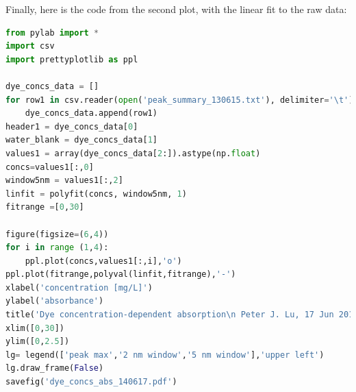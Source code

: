 Finally, here is the code from the second plot, with the linear fit to the
{raw data}:
\begin{lstlisting}[showspaces=false,showtabs=false,language=python,basicstyle=\ttfamily\footnotesize,columns=fixed,frame=tlbr,float]
from pylab import *
import csv
import prettyplotlib as ppl

dye_concs_data = []
for row1 in csv.reader(open('peak_summary_130615.txt'), delimiter='\t'): 
    dye_concs_data.append(row1)
header1 = dye_concs_data[0]
water_blank = dye_concs_data[1]
values1 = array(dye_concs_data[2:]).astype(np.float)
concs=values1[:,0]
window5nm = values1[:,2]
linfit = polyfit(concs, window5nm, 1)
fitrange =[0,30]

figure(figsize=(6,4))
for i in range (1,4):
    ppl.plot(concs,values1[:,i],'o')
ppl.plot(fitrange,polyval(linfit,fitrange),'-')
xlabel('concentration [mg/L]')
ylabel('absorbance')
title('Dye concentration-dependent absorption\n Peter J. Lu, 17 Jun 2014')
xlim([0,30])
ylim([0,2.5])
lg= legend(['peak max','2 nm window','5 nm window'],'upper left')
lg.draw_frame(False)
savefig('dye_concs_abs_140617.pdf')
\end{lstlisting}   %

